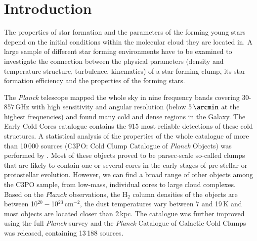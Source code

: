 \documentclass[printer]{aa}
\begin{document}
\section{Introduction}
\label{intro}

The properties of star formation and the parameters of the forming young stars depend on the initial conditions within the molecular cloud they are located in. A large sample of different star forming environments have to be examined to investigate the connection between the physical parameters (density and temperature structure, turbulence, kinematics) of a star-forming clump, its star formation efficiency and the properties of the forming stars.

The \textit{Planck} telescope \citep{tauber2010} mapped the whole sky in nine frequency bands covering 30-857\,GHz with high sensitivity and angular resolution (below 5\,$\arcmin$ at the highest frequencies) and found many cold and dense regions in the Galaxy. The Early Cold Cores catalogue \citep[ECC;][]{planck2011a} contains the 915 most reliable detections of these cold structures. A statistical analysis of the properties of the whole catalogue of more than 10\,000 sources (C3PO: Cold Clump Catalogue of \textit{Planck} Objects) was performed by \citet{planck2011b}. Most of these objects proved to be parsec-scale so-called clumps that are likely to contain one or several cores in the early stages of pre-stellar or protostellar evolution. However, we can find a broad range of other objects among the C3PO sample, from low-mass, individual cores to large cloud complexes. Based on the $Planck$ observations, the H$_2$ column densities of the objects are between 10$^{20}-$10$^{23}$\,cm$^{-2}$, the dust temperatures vary between 7 and 19\,K and most objects are located closer than 2\,kpc. The catalogue was further improved using the full \textit{Planck} survey and the \textit{Planck} Catalogue of Galactic Cold Clumps \citep[PGCC;][]{planck2016} was released, containing 13\,188 sources.
\end{document}
